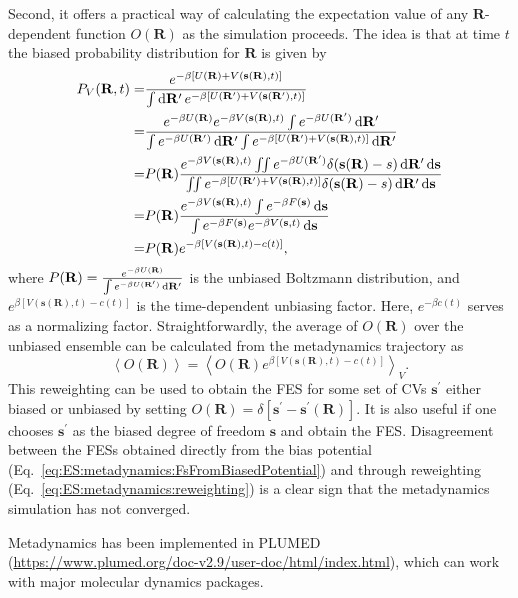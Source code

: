 Second, it offers a practical way of calculating the expectation value of any $\mathbf{R}$-dependent function $O(\mathbf{R})$ as the simulation proceeds. The idea is that at time $t$ the biased probability distribution for $\mathbf{R}$ is given by
\begin{align}
    P_V{(\mathbf{R},t)}=&\frac{e^{-\beta\left[U(\mathbf{R})+V(\mathbf{s}(\mathbf{R}),t)\right]}}{\int \diff \mathbf{R}^\prime\, e^{-\beta\left[U(\mathbf{R}^\prime)+V(\mathbf{s}(\mathbf{R}^\prime),t)\right]}}\notag\\
                       =&\frac{e^{-\beta U(\mathbf{R})}e^{-\beta V(\mathbf{s}(\mathbf{R}),t)}\int e^{-\beta U(\mathbf{R^\prime})}\diff \mathbf{R}^\prime}{\int e^{-\beta U(\mathbf{R^\prime})}\diff \mathbf{R}^\prime \int e^{-\beta \left[U(\mathbf{R}^\prime)+V(\mathbf{s}(\mathbf{R}),t)\right]}\diff \mathbf{R}^\prime}\notag\\
                       =&P(\mathbf{R})\frac{e^{-\beta V(\mathbf{s}(\mathbf{R}),t)}\iint e^{-\beta U(\mathbf{R^\prime})}\delta (\mathbf{s}(\mathbf{R})-s)\diff \mathbf{R}^\prime \diff \mathbf{s}}{\iint e^{-\beta \left[U(\mathbf{R}^\prime)+V(\mathbf{s}(\mathbf{R}),t)\right]}\delta (\mathbf{s}(\mathbf{R})-s)\diff \mathbf{R}^\prime \diff \mathbf{s}}\notag\\
                       =&P(\mathbf{R})\frac{e^{-\beta V(\mathbf{s}(\mathbf{R}),t)}\int e^{-\beta F(\mathbf{s})}\diff \mathbf{s}}{\int e^{-\beta F(\mathbf{s})}e^{-\beta V(\mathbf{s},t)}\diff \mathbf{s}}\notag\\
                       =&P{(\mathbf{R})}e^{-\beta\left[V(\mathbf{s}(\mathbf{R}),t)-c(t)\right]},
\end{align}
where $P{(\mathbf{R})}=\frac{e^{-\beta U(\mathbf{R})}}{\int e^{-\beta U(\mathbf{R}^\prime)}\mathop{}\!\mathrm{d} \mathbf{R}^\prime}$ is the unbiased Boltzmann distribution, and $e^{\beta\left[V(\mathbf{s}(\mathbf{R}),t)-c(t)\right]}$ is the time-dependent unbiasing factor. Here, $e^{-\beta c(t)}$ serves as a normalizing factor. Straightforwardly, the average of $O(\mathbf{R})$ over the unbiased ensemble can be calculated from the metadynamics trajectory as
\begin{equation}
    \left<O(\mathbf{R})\right>=\left<O(\mathbf{R})e^{\beta\left[V(\mathbf{s}(\mathbf{R}),t)-c(t)\right]}\right>_V.
    \label{eq:ES:metadynamics:reweighting}
\end{equation}
This reweighting can be used to obtain the FES for some set of CVs $\mathbf{s}^\prime$ either biased or unbiased by setting $O(\mathbf{R})=\delta[\mathbf{s}^\prime-\mathbf{s}^\prime(\mathbf{R})]$. It is also useful if one chooses $\mathbf{s}^\prime$ as the biased degree of freedom $\mathbf{s}$ and obtain the FES. Disagreement between the FESs obtained directly from the bias potential (Eq.~\ref{eq:ES:metadynamics:FsFromBiasedPotential}) and through reweighting (Eq.~\ref{eq:ES:metadynamics:reweighting}) is a clear sign that the metadynamics simulation has not converged.

Metadynamics has been implemented in PLUMED (\url{https://www.plumed.org/doc-v2.9/user-doc/html/index.html}), which can work with major molecular dynamics packages.
